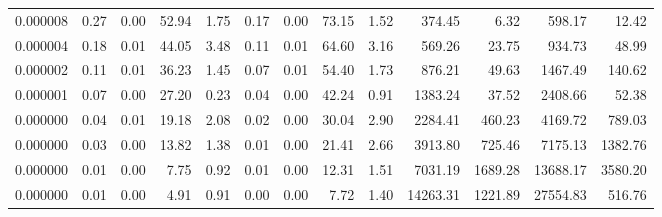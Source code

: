 \begin{tabular}{lrrrrrrrrrrrr}
0.000008 & 0.27 & 0.00 & 52.94 & 1.75 & 0.17 & 0.00 & 73.15 & 1.52 & 374.45 & 6.32 & 598.17 & 12.42 \\
0.000004 & 0.18 & 0.01 & 44.05 & 3.48 & 0.11 & 0.01 & 64.60 & 3.16 & 569.26 & 23.75 & 934.73 & 48.99 \\
0.000002 & 0.11 & 0.01 & 36.23 & 1.45 & 0.07 & 0.01 & 54.40 & 1.73 & 876.21 & 49.63 & 1467.49 & 140.62 \\
0.000001 & 0.07 & 0.00 & 27.20 & 0.23 & 0.04 & 0.00 & 42.24 & 0.91 & 1383.24 & 37.52 & 2408.66 & 52.38 \\
0.000000 & 0.04 & 0.01 & 19.18 & 2.08 & 0.02 & 0.00 & 30.04 & 2.90 & 2284.41 & 460.23 & 4169.72 & 789.03 \\
0.000000 & 0.03 & 0.00 & 13.82 & 1.38 & 0.01 & 0.00 & 21.41 & 2.66 & 3913.80 & 725.46 & 7175.13 & 1382.76 \\
0.000000 & 0.01 & 0.00 & 7.75 & 0.92 & 0.01 & 0.00 & 12.31 & 1.51 & 7031.19 & 1689.28 & 13688.17 & 3580.20 \\
0.000000 & 0.01 & 0.00 & 4.91 & 0.91 & 0.00 & 0.00 & 7.72 & 1.40 & 14263.31 & 1221.89 & 27554.83 & 516.76 \\
\bottomrule
\end{tabular}
